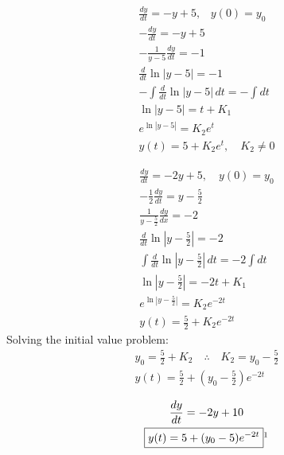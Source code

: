 \begin{solution}
	\begin{solparts}
		\item 
		\begin{gather*}
			\frac{dy}{dt}=-y+5\text{,}\quad y(0)=y_0\\
			-\frac{dy}{dt}=-y+5\\
			-\frac{1}{y-5}\frac{dy}{dt}=-1\\
			\frac{d}{dt}\ln |y-5|=-1\\
			-\int \frac{d}{dt}\ln |y-5| \, dt=-\int dt\\
			\ln |y-5|=t+K_1\\
			e^{\ln |y-5|}=K_2 e^t\\
			\boxed{y(t)=5+K_2 e^t, \quad K_2 \neq 0}
		\end{gather*}
		
		\item
		\begin{gather*}
			\frac{dy}{dt}=-2y+5,\quad y(0)=y_0\\
			-\frac{1}{2}\frac{dy}{dt}=y-\frac{5}{2}\\
			\frac{1}{y-\frac{5}{2}}\frac{dy}{dx}=-2\\
			\frac{d}{dt}\ln|y-\frac{5}{2}|=-2\\
			\int \frac{d}{dt}\ln|y-\frac{5}{2}| \, dt = -2\int dt\\
			\ln|y-\frac{5}{2}|=-2t + K_1\\
			e^{\ln|y-\frac{5}{2}|}=K_2 e^{-2t}\\
			y(t)=\frac{5}{2}+K_2 e^{-2t}
		\end{gather*}
			Solving the initial value problem:
		\begin{gather*}	
			y_0=\frac{5}{2}+K_2 \quad \therefore \quad K_2=y_0-\frac{5}{2}\\
			\boxed{y(t)=\frac{5}{2}+\left(y_0 -\frac{5}{2}\right)e^{-2t}}
		\end{gather*}
		\item
		\begin{gather*}
			\frac{dy}{dt}=-2y+10\\
			\boxed{y(t)=5+(y_0-5)e^{-2t}}\footnotemark
		\end{gather*}
	\end{solparts}
\end{solution}
\pagebreak
